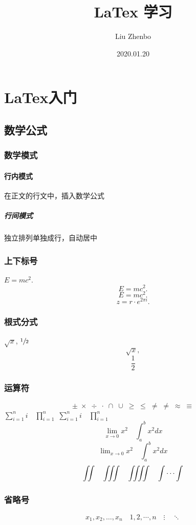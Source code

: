 \documentclass[UTF8]{ctexart}
\title{LaTex 学习}
\author{Liu Zhenbo}
\date{2020.01.20}
\begin{document}
\maketitle
\tableofcontents


\section{LaTex入门}

\subsection{数学公式}

\subsubsection{数学模式}
\paragraph{行内模式}
在正文的行文中，插入数学公式
\subparagraph{行间模式}
独立排列单独成行，自动居中

\subsubsection{上下标号}
$E=mc^2$.
\[E=mc^2.\]
\begin{equation}
    E=mc^2.
\end{equation}
\[z = r\cdot e^{2\pi i}. \]

\subsubsection{根式分式}
$\sqrt{x}$, $\sfrac{1}{2}$
\[ \sqrt{x},  \]
\[\frac{1}{2}\]

\subsubsection{运算符}
\[ \pm\; \times\;  \div\; \cdot\; \cap\; \cup\;\geq\;\leq\;\neq\;\neq\;\approx\;\equiv\]
$ \sum_{i=1}^n i\quad \prod_{i=1}^n $
$ \sum\limits_{i=1}^n i\quad \prod\limits_{i=1}^n $
\[\lim_{x\to0}x^2 \quad \int_a^b x^2 dx \]
\[\lim \nolimits _{x\to0}x^2 \quad \int \nolimits_a^b x^2 dx \]
\[ \iint\quad \iiint\quad \iiiint\quad \idotsint\]

\subsubsection{省略号}
\[x_1, x_2, \dots, x_n\quad 1,2, \cdots, n\quad \vdots\quad \ddots\]
\end{document}
